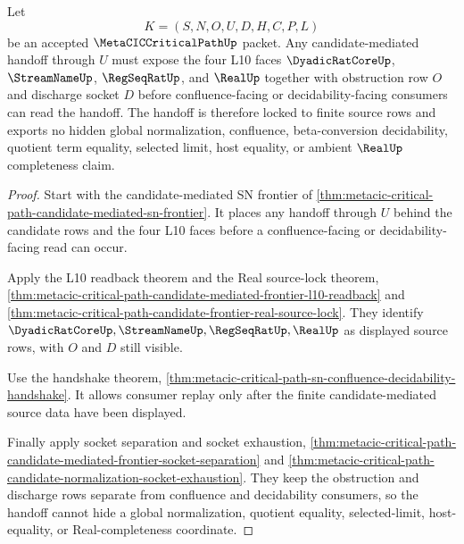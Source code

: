 \begin{theorem}
\label{thm:metacic-criticalpath-candidate-frontier-source-lock}
Let
$$
K=(S,N,O,U,D,H,C,P,L)
$$
be an accepted $\MetaCICCriticalPathUp$ packet. Any candidate-mediated handoff through $U$ must expose the four L10 faces $\DyadicRatCoreUp$, $\StreamNameUp$, $\RegSeqRatUp$, and $\RealUp$ together with obstruction row $O$ and discharge socket $D$ before confluence-facing or decidability-facing consumers can read the handoff. The handoff is therefore locked to finite source rows and exports no hidden global normalization, confluence, beta-conversion decidability, quotient term equality, selected limit, host equality, or ambient $\RealUp$ completeness claim.
\end{theorem}
\begin{proof}
Start with the candidate-mediated SN frontier of \autoref{thm:metacic-critical-path-candidate-mediated-sn-frontier}. It places any handoff through $U$ behind the candidate rows and the four L10 faces before a confluence-facing or decidability-facing read can occur.

Apply the L10 readback theorem and the Real source-lock theorem, \autoref{thm:metacic-critical-path-candidate-mediated-frontier-l10-readback} and \autoref{thm:metacic-critical-path-candidate-frontier-real-source-lock}. They identify $\DyadicRatCoreUp,\StreamNameUp,\RegSeqRatUp,\RealUp$ as displayed source rows, with $O$ and $D$ still visible.

Use the handshake theorem, \autoref{thm:metacic-critical-path-sn-confluence-decidability-handshake}. It allows consumer replay only after the finite candidate-mediated source data have been displayed.

Finally apply socket separation and socket exhaustion, \autoref{thm:metacic-critical-path-candidate-mediated-frontier-socket-separation} and \autoref{thm:metacic-critical-path-candidate-normalization-socket-exhaustion}. They keep the obstruction and discharge rows separate from confluence and decidability consumers, so the handoff cannot hide a global normalization, quotient equality, selected-limit, host-equality, or Real-completeness coordinate.
\end{proof}

